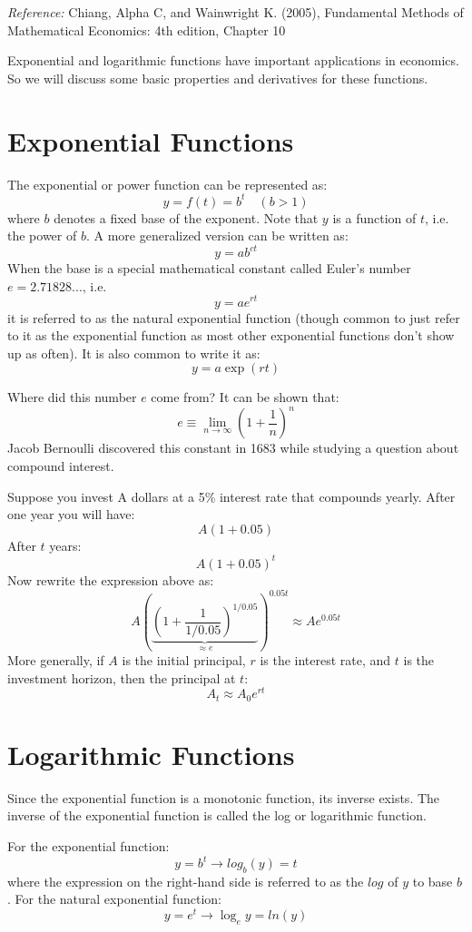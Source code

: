 \documentclass{./../../latex/handout}
\begin{document}
\thispagestyle{plain}
\newcommand{\mytitle}{Exponential and Logarithmic Functions}
\myheader{\mytitle}

\textit{Reference:} Chiang, Alpha C, and Wainwright K. (2005), Fundamental Methods of Mathematical Economics: 4th edition, Chapter 10 

Exponential and logarithmic functions have important applications in economics. So we will discuss some basic properties and derivatives for these functions.

\section{Exponential Functions}
The exponential or power function can be represented as:
\[
y=f(t)=b^{t} \quad(b>1)
\]
where $b$ denotes a fixed base of the exponent. Note that $y$ is a function of $t$, i.e. the power of $b$. A more generalized version can be written as:
\[
y=a b^{c t}
\] 
When the base is a special mathematical constant called Euler's number $e=2.71828...$, i.e.
\[
y=a e^{r t}
\]
it is referred to as the natural exponential function (though common to just refer to it as the exponential function as most other exponential functions don't show up as often). It is also common to write it as:
\[
y=a \exp (r t)
\] 

Where did this number $e$ come from? It can be shown that:
\[
e \equiv \lim _{n \rightarrow \infty}\left(1+\frac{1}{n}\right)^{n}
\]
Jacob Bernoulli discovered this constant in 1683 while studying a question about compound interest. 

Suppose you invest A dollars at a 5\% interest rate that compounds yearly. After one year you will have:
\[ A \left(1+0.05\right)  \] 
After $t$ years:
\[ A \left(1+0.05\right)^{t} \]
Now rewrite the expression above as:
\[ A\left( \underbrace{\left(1+\frac{1}{1/0.05}\right)^{1/0.05}}_{\approx e} \right)^{0.05t} \approx A e^{0.05t}  \]
More generally, if $A$ is the initial principal, $r$ is the interest rate, and $t$ is the investment horizon, then the principal at $t$:
\[ A_t \approx A_0 e^{rt} \]

\section{Logarithmic Functions}
Since the exponential function is a monotonic function, its inverse exists. The inverse of the exponential function is called the log or logarithmic function.

For the exponential function: 
\[ y=b^{t} \rightarrow log_b(y) = t  \]
where the expression on the right-hand side is referred to as the $log$ of $y$ to base $b$. For the natural exponential function:
\[y=e^{t} \rightarrow \log _{e} y =ln(y) \]
\end{document}
